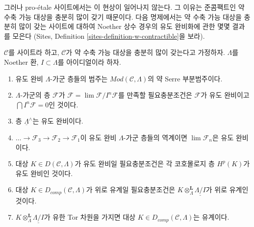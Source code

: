 \medskip\noindent
그러나 pro-\'etale 사이트에서는 이 현상이 일어나지 않는다.
그 이유는 준콤팩트인 약 수축 가능 대상을 충분히 많이 갖기 때문이다.
다음 명제에서는 약 수축 가능 대상을 충분히 많이 갖는 사이트에
대하여 Noether 상수 경우의 유도 완비화에 관한 몇몇 결과를 모은다
(Sites, Definition \ref{sites-definition-w-contractible}을 보라).

\begin{proposition}
\label{proposition-enough-weakly-contractibles}
$\mathcal{C}$를 사이트라 하고, $\mathcal{C}$가 약 수축 가능 대상을
충분히 많이 갖는다고 가정하자. $\Lambda$를 Noether 환,
$I \subset \Lambda$를 아이디얼이라 하자.
\begin{enumerate}
\item 유도 완비 $\Lambda$-가군 층들의 범주는
$\textit{Mod}(\mathcal{C}, \Lambda)$의 약 Serre 부분범주이다.
\item $\Lambda$-가군의 층 $\mathcal{F}$가
$\mathcal{F} = \lim \mathcal{F}/I^n\mathcal{F}$를 만족할 필요충분조건은
$\mathcal{F}$가 유도 완비이고 $\bigcap I^n\mathcal{F} = 0$인 것이다.
\item 층 $\underline{\Lambda}^\wedge$는 유도 완비이다.
\item $\ldots \to \mathcal{F}_3 \to \mathcal{F}_2 \to \mathcal{F}_1$이
유도 완비 $\Lambda$-가군 층들의 역계이면
$\lim \mathcal{F}_n$은 유도 완비이다.
\item 대상 $K \in D(\mathcal{C}, \Lambda)$가 유도 완비일 필요충분조건은
각 코호몰로지 층 $H^p(K)$가 유도 완비인 것이다.
\item 대상 $K \in D_{comp}(\mathcal{C}, \Lambda)$가 위로 유계일
필요충분조건은
$K \otimes_\Lambda^\mathbf{L} \underline{\Lambda/I}$가 위로 유계인
것이다.
\item $K \otimes_\Lambda^\mathbf{L} \underline{\Lambda/I}$가 유한 Tor
차원을 가지면 대상 $K \in D_{comp}(\mathcal{C}, \Lambda)$는 유계이다.
\end{enumerate}
\end{proposition}

